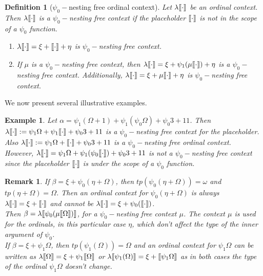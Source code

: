 \documentclass{amsart}
\theoremstyle{plain}
\theoremstyle{plain}
\newtheorem{remark}[theorem]{Remark}
\newtheorem{example}[theorem]{Example}
\newtheorem*{definition}{Definition}
\def\scbrl{[\hspace{-.14em}[}
\def\scbrr{]\hspace{-.14em}]}
\def\scbr#1{\scbrl#1\scbrr}
\newcommand{\Om}{{\Omega}}
\newcommand{\al}{{\alpha}}
\newcommand{\be}{{\beta}}
\newcommand{\la}{\lambda}
\newcommand{\om}{\omega}
\def\scbrl{[\hspace{-.14em}[}
\def\scbrr{]\hspace{-.14em}]}
\def\scbr#1{\scbrl#1\scbrr}
\begin{document}
\begin{definition}[$\psi_0-$nesting free ordinal context]
Let $\la\scbr{\cdot}$ be an ordinal context. 
Then $\la\scbr{\cdot}$ is a $\psi_0-$nesting free context if the placeholder $\scbr{\cdot}$ is not in the scope of a $\psi_0$ function.
\begin{enumerate}[label=(\roman*)]
    \item $\la\scbr{\cdot} =\xi+\scbr{\cdot}+\eta$ is $\psi_0-$nesting free context.
    \item If $\mu$ is a $\psi_0-$nesting free context, then $\la\scbr{\cdot} = \xi + \psi_1(\mu\scbr{\cdot}) +\eta$ is a $\psi_0-$nesting free context.
    Additionally, $\la\scbr{\cdot} = \xi +\mu\scbr{\cdot} +\eta$ is $\psi_0-$nesting free context.
\end{enumerate}
\end{definition}
\smallskip
We now present several illustrative examples.\smallskip

\begin{example}
Let $\al= \psi_1(\Om+1)+\psi_1({\psi_0\Om})  + \psi_0{3}  +11 $. Then $\la\scbr{\cdot}:=  \psi_1\Om + \psi_1{ \scbr{\cdot}} + \psi_0{3} +11 $ is a $\psi_0-$nesting free context for the placeholder.
Also $\la\scbr{\cdot} := \psi_1\Om + \scbr{\cdot} + \psi_0{3} +11$ is a $\psi_0-$nesting free ordinal context.
\\
However, $\la\scbr{\cdot} = \psi_1{\Om}+ \psi_1({\psi_0\scbr{\cdot}}) + \psi_0{3}  +11 $ is not a $\psi_0-$nesting free context since the placeholder $\scbr{\cdot}$ is under the scope of a $\psi_0$ function.
\\
\end{example}

\begin{remark}
If $\be = \xi +\psi_0(\eta + \Om)$, then $tp(\psi_0(\eta+\Om)) = \om$ and $tp(\eta+\Om) =\Om$. Then an ordinal context for $\psi_0(\eta +\Om)$ is always
$\la\scbr{\cdot} =\xi + \scbr{\cdot}$ and cannot be $\la\scbr{\cdot} =\xi+ \psi_0(\scbr{\cdot})$.
\\
Then $\be =\la\scbr{\psi_0(\mu\scbr{\Om})}$, for a $\psi_0-$nesting free context $\mu$. 
The context $\mu$ is used for the ordinals, in this particular case $\eta$, which don't affect the type of the inner argument of $\psi_0$.
\\
If $\be = \xi + \psi_1\Om$, then $tp(\psi_1(\Om)) =\Om$ and an ordinal context for $\psi_1\Om$ can be written as $\la\scbr{\Om}=\xi + \psi_1\scbr{\Om}$ or $\la\scbr{\psi_1(\Om)} = \xi +\scbr{\psi_1\Om}$ as in both cases the type of the ordinal $\psi_1\Om$ doesn't change.\\
\end{remark}
\end{document}
